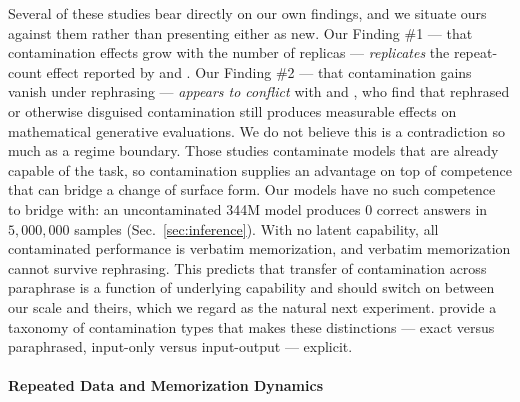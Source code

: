 Several of these studies bear directly on our own findings, and we situate ours against them rather than presenting either as new. Our Finding \#1 --- that contamination effects grow with the number of replicas --- \emph{replicates} the repeat-count effect reported by \citet{jiang2024investigatingdatacontaminationpretraining} and \citet{dekoninck2024constat}. Our Finding \#2 --- that contamination gains vanish under rephrasing --- \emph{appears to conflict} with \citet{mehrbakhsh2024confounders} and \citet{dekoninck2024evading}, who find that rephrased or otherwise disguised contamination still produces measurable effects on mathematical generative evaluations. We do not believe this is a contradiction so much as a regime boundary. Those studies contaminate models that are already capable of the task, so contamination supplies an advantage on top of competence that can bridge a change of surface form. Our models have no such competence to bridge with: an uncontaminated 344M model produces $0$ correct answers in $5{,}000{,}000$ samples (Sec.~\ref{sec:inference}). With no latent capability, all contaminated performance is verbatim memorization, and verbatim memorization cannot survive rephrasing. This predicts that transfer of contamination across paraphrase is a function of underlying capability and should switch on between our scale and theirs, which we regard as the natural next experiment. \citet{palavalli2024taxonomy} provide a taxonomy of contamination types that makes these distinctions --- exact versus paraphrased, input-only versus input-output --- explicit.

\paragraph{Repeated Data and Memorization Dynamics}

